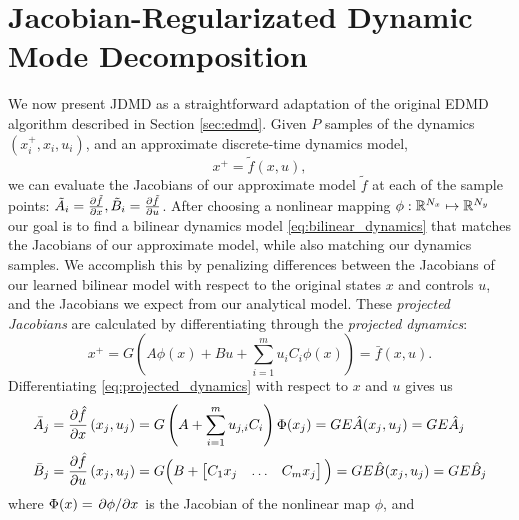 \documentclass[../root.tex]{subfiles}
\begin{document}
\section{Jacobian-Regularizated Dynamic Mode Decomposition} \label{sec:jdmd}

We now present JDMD as a straightforward adaptation of the original EDMD algorithm described
in Section \ref{sec:edmd}. Given $P$ samples of the dynamics $(x_i^+, x_i, u_i)$, and an
approximate discrete-time dynamics model,
\begin{equation}
  x^+ = \tilde{f}(x,u),
\end{equation}
we can evaluate the Jacobians of our approximate model $\tilde{f}$ at each of the sample
points: $\tilde{A}_i = \pdv{\tilde{f}}{x}, \tilde{B}_i = \pdv{\tilde{f}}{u}$. After
choosing a nonlinear mapping $\phi : \mathbb{R}^{N_x} \mapsto \mathbb{R}^{N_y}$ our goal is to find a
bilinear dynamics model \eqref{eq:bilinear_dynamics} that matches the Jacobians of our
approximate model, while also matching our dynamics samples. We accomplish this by 
penalizing differences between the Jacobians of our learned bilinear model with respect to 
the original states $x$ and controls $u$, and the Jacobians we expect from our analytical 
model. These \textit{projected Jacobians} are calculated by differentiating through the 
\textit{projected dynamics}:
\begin{equation} \label{eq:projected_dynamics}
  x^+ = G \left( A \phi(x) + B u + \sum_{i=1}^m u_i C_i \phi(x) \right)  = \bar{f}(x,u).
\end{equation}
Differentiating \eqref{eq:projected_dynamics} with respect to $x$ and $u$ gives us
\begin{subequations} \label{eq:projected_jacobians}
  \begin{align}
    \bar{A}_j &= \pdv{\hat{f}}{x}\left(x_j,u_j\right) 
    = G \left(A + \sum_{i=1}^m u_{j,i} C_i \right) \Phi(x_j)
    = G E \hat{A}(x_j,u_j) = G E \hat{A}_j \\
    \bar{B}_j &= \pdv{\hat{f}}{u}\left(x_j,u_j\right) 
    = G \Big(B + \begin{bmatrix} C_1 x_j & \dots & C_m x_j \end{bmatrix} \Big)
    = G E \hat{B}(x_j,u_j) = G E \hat{B}_j
  \end{align}
\end{subequations}
where $\Phi(x) = \pdv*{\phi}{x}$ is the Jacobian of the nonlinear map $\phi$, and
\end{document}
